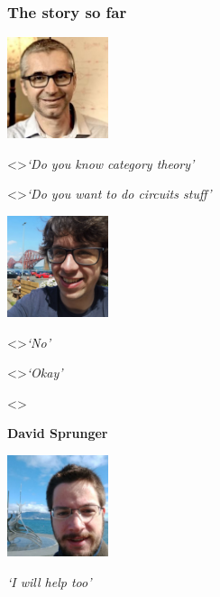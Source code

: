 \begin{frame}
    \frametitle{The story so far}

    \centering

    \begin{minipage}{0.45\textwidth}
        \centering


        \vspace{0.5em}

        \includegraphics[width=8em]{imgs/ghica}

        \visible<\iftoggle{static}{1}{2-}>{\emph{`Do you know category theory'}}

        \visible<\iftoggle{static}{1}{4-}>{\emph{`Do you want to do circuits stuff'}}
    \end{minipage}
    \begin{minipage}{0.25\textwidth}
        \centering


        \vspace{0.5em}

        \includegraphics[width=8em]{imgs/kaye}%

        \visible<\iftoggle{static}{1}{3-}>{\emph{`No'}}

        \visible<\iftoggle{static}{1}{5-}>{\emph{`Okay'}}
    \end{minipage}
    \visible<\iftoggle{static}{1}{6-}>{%
        \begin{minipage}{0.25\textwidth}
            \centering

            \textbf{David Sprunger}

            \vspace{0.5em}

            \includegraphics[width=8em]{imgs/sprunger}

            \phantom{hello}

            \emph{`I will help too'}
        \end{minipage}%
    }
\end{frame}
